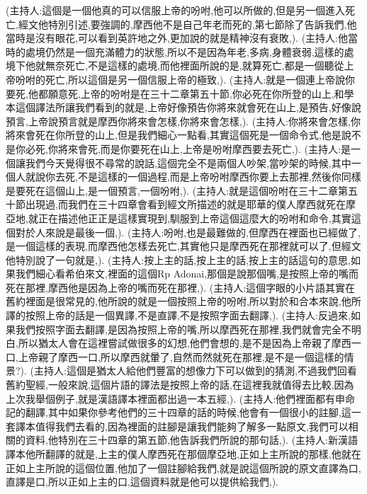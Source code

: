 \documentclass{book}
\begin{document}
(主持人:這個是一個他真的可以信服上帝的吩咐,他可以所做的,但是另一個進入死亡,經文他特別引述,要強調的,摩西他不是自己年老而死的,第七節除了告訴我們,他當時是沒有眼花,可以看到英許地之外,更加說的就是精神沒有衰敗,).
(主持人:他當時的處境仍然是一個充滿體力的狀態,所以不是因為年老,多病,身體衰弱,這樣的處境下他就無奈死亡,不是這樣的處境,而他裡面所說的是,就算死亡,都是一個聽從上帝吩咐的死亡,所以這個是另一個信服上帝的極致,).
(主持人:就是一個連上帝說你要死,他都願意死,上帝的吩咐是在三十二章第五十節,你必死在你所登的山上,和學本這個譯法所讓我們看到的就是,上帝好像預告你將來就會死在山上,是預告,好像說預言,上帝說預言就是摩西你將來會怎樣,你將來會怎樣,).
(主持人:你將來會怎樣,你將來會死在你所登的山上,但是我們細心一點看,其實這個死是一個命令式,他是說不是你必死,你將來會死,而是你要死在山上,上帝是吩咐摩西要去死亡,).
(主持人:是一個讓我們今天覺得很不尋常的說話,這個完全不是兩個人吵架,當吵架的時候,其中一個人就說你去死,不是這樣的一個過程,而是上帝吩咐摩西你要上去那裡,然後你同樣是要死在這個山上,是一個預言,一個吩咐,).
(主持人:就是這個吩咐在三十二章第五十節出現過,而我們在三十四章會看到經文所描述的就是耶華的僕人摩西就死在摩亞地,就正在描述他正正是這樣實現到,馴服到上帝這個這麼大的吩咐和命令,其實這個對於人來說是最後一個,).
(主持人:吩咐,也是最難做的,但摩西在裡面也已經做了,是一個這樣的表現,而摩西他怎樣去死亡,其實他只是摩西死在那裡就可以了,但經文他特別說了一句就是,).
(主持人:按上主的話,按上主的話,按上主的話這句的意思,如果我們細心看希伯來文,裡面的這個Rp Adonai,那個是說那個嘴,是按照上帝的嘴而死在那裡,摩西他是因為上帝的嘴而死在那裡,).
(主持人:這個字眼的小片語其實在舊約裡面是很常見的,他所說的就是一個按照上帝的吩咐,所以對於和合本來說,他所譯的按照上帝的話是一個異譯,不是直譯,不是按照字面去翻譯,).
(主持人:反過來,如果我們按照字面去翻譯,是因為按照上帝的嘴,所以摩西死在那裡,我們就會完全不明白,所以猶太人會在這裡嘗試做很多的幻想,他們會想的,是不是因為上帝親了摩西一口,上帝親了摩西一口,所以摩西就暈了,自然而然就死在那裡,是不是一個這樣的情景?).
(主持人:這個是猶太人給他們豐富的想像力下可以做到的猜測,不過我們回看舊約聖經,一般來說,這個片語的譯法是按照上帝的話,在這裡我就值得去比較,因為上次我舉個例子,就是漢語譯本裡面都出過一本五經,).
(主持人:他們裡面都有申命記的翻譯,其中如果你參考他們的三十四章的話的時候,他會有一個很小的註腳,這一套譯本值得我們去看的,因為裡面的註腳是讓我們能夠了解多一點原文,我們可以相關的資料,他特別在三十四章的第五節,他告訴我們所說的那句話,).
(主持人:新漢語譯本他所翻譯的就是,上主的僕人摩西死在那個摩亞地,正如上主所說的那樣,他就在正如上主所說的這個位置,他加了一個註腳給我們,就是說這個所說的原文直譯為口,直譯是口,所以正如上主的口,這個資料就是他可以提供給我們,).
\end{document}
